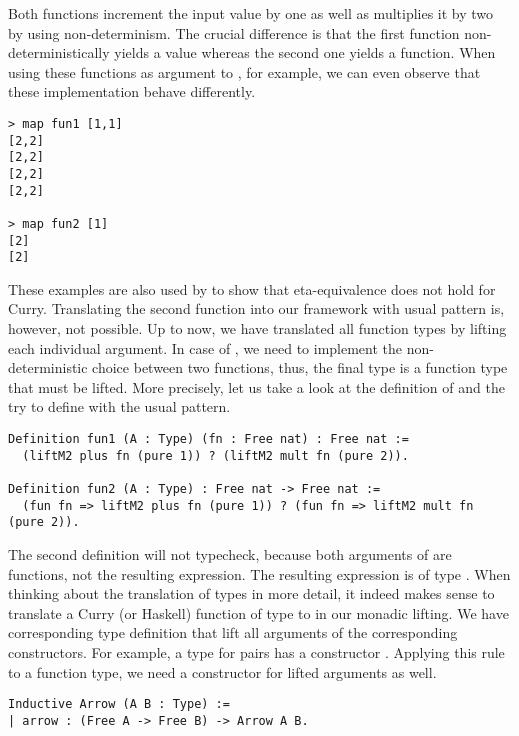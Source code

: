 Both functions increment the input value by one as well as multiplies it by two by using non-determinism.
The crucial difference is that the first function non-deterministically yields a value whereas the second one yields a function.
When using these functions as argument to , for example, we can even observe that these implementation behave differently.

\begin{verbatim}
> map fun1 [1,1]
[2,2]
[2,2]
[2,2]
[2,2]

> map fun2 [1]
[2]
[2]
\end{verbatim}

These examples are also used by \citet{mehner2014parametricity} to show that eta-equivalence does not hold for Curry.
Translating the second function into our framework with usual pattern is, however, not possible.
Up to now, we have translated all function types by lifting each individual argument.
In case of , we need to implement the non-deterministic choice between two functions, thus, the final type is a function type that must be lifted.
More precisely, let us take a look at the definition of  and the try to define  with the usual pattern.

\begin{verbatim}
Definition fun1 (A : Type) (fn : Free nat) : Free nat :=
  (liftM2 plus fn (pure 1)) ? (liftM2 mult fn (pure 2)).

Definition fun2 (A : Type) : Free nat -> Free nat :=
  (fun fn => liftM2 plus fn (pure 1)) ? (fun fn => liftM2 mult fn (pure 2)).
\end{verbatim}

The second definition will not typecheck, because both arguments of  are functions, not the resulting expression.
The resulting expression is of type .
When thinking about the translation of types in more detail, it indeed makes sense to translate a Curry (or Haskell) function of type  to  in our monadic lifting.
We have corresponding type definition that lift all arguments of the corresponding constructors.
For example, a type for pairs has a constructor .
Applying this rule to a function type, we need a constructor for lifted arguments as well.

\begin{verbatim}
Inductive Arrow (A B : Type) :=
| arrow : (Free A -> Free B) -> Arrow A B.
\end{verbatim}


